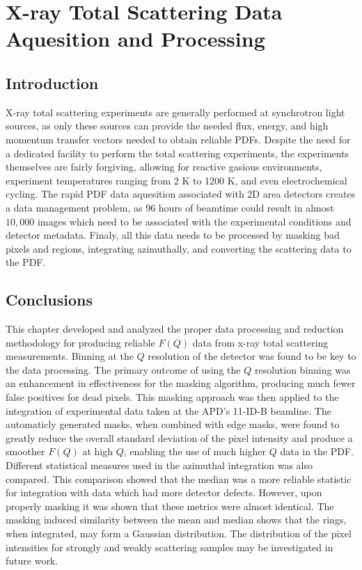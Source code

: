 \graphicspath{{dp/figures/}}
\chapter{X-ray Total Scattering Data Aquesition and Processing} \label{ch:dp}
\section{Introduction}
X-ray total scattering experiments are generally performed at synchrotron light sources, as only these sources can provide the needed flux, energy, and high momentum transfer vectors needed to obtain reliable PDFs. \cite{Chupas2003, Dykhne2011}
Despite the need for a dedicated facility to perform the total scattering experiments, the experiments themselves are fairly forgiving, allowing for reactive gasious environments, experiment temperatures ranging from 2 \si{K} to 1200 \si{K}, and even electrochemical cycling. \cite{Chupas2008, Petkov2013, Redmond2012}
The rapid PDF data aquesition associated with 2D area detectors creates a data management problem, as 96 hours of beamtime could result in almost $10,000$ images which need to be associated with the experimental conditions and detector metadata. \cite{Chupas2003}
 Finaly, all this data needs to be processed by masking bad pixels and regions, integrating azimuthally, and converting the scattering data to the PDF. \cite{Kieffer2013, Juhas2013, Yang2014, Pauw2014, Billinge2012}

%







\section{Conclusions}
This chapter developed and analyzed the proper data processing and reduction methodology for producing reliable $F(Q)$ data from x-ray total scattering measurements.
Binning at the $Q$ resolution of the detector was found to be key to the data processing.
The primary outcome of using the $Q$ resolution binning was an enhancement in effectiveness for the masking algorithm, producing much fewer false positives for dead pixels.
This masking approach was then applied to the integration of experimental data taken at the APD's 11-ID-B beamline.
The automaticly generated masks, when combined with edge masks, were found to greatly reduce the overall standard deviation of the pixel intensity and produce a smoother $F(Q)$ at high $Q$, enabling the use of much higher $Q$ data in the PDF.
Different statistical measures used in the azimuthal integration was also compared.
This comparison showed that the median was a more reliable statistic for integration with data which had more detector defects.
However, upon properly masking it was shown that these metrics were almost identical.
The masking induced similarity between the mean and median shows that the rings, when integrated, may form a Gaussian distribution.
The distribution of the pixel intensities for strongly and weakly scattering samples may be investigated in future work.